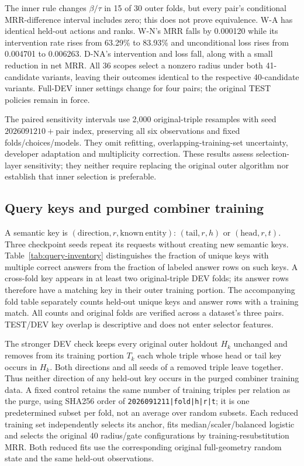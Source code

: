 \documentclass[11pt,a4paper]{article}
\begin{document}

The inner rule changes $\beta/\tau$ in 15 of 30 outer folds, but every pair's conditional MRR-difference interval includes zero; this does not prove equivalence. W-A has identical held-out actions and ranks. W-N's MRR falls by 0.000120 while its intervention rate rises from 63.29\% to 83.93\% and unconditional loss rises from 0.004701 to 0.006263. D-NA's intervention and loss fall, along with a small reduction in net MRR. All 36 scopes select a nonzero radius under both 41-candidate variants, leaving their outcomes identical to the respective 40-candidate variants. Full-DEV inner settings change for four pairs; the original TEST policies remain in force.

The paired sensitivity intervals use 2,000 original-triple resamples with seed $2026091210+$pair index, preserving all six observations and fixed folds/choices/models. They omit refitting, overlapping-training-set uncertainty, developer adaptation and multiplicity correction. These results assess selection-layer sensitivity; they neither require replacing the original outer algorithm nor establish that inner selection is preferable.


\FloatBarrier

\subsection{Query keys and purged combiner training}
\label{app:query-isolation}
A semantic key is $(\mathrm{direction},r,\mathrm{known\ entity})$: $(\mathrm{tail},r,h)$ or $(\mathrm{head},r,t)$. Three checkpoint seeds repeat its requests without creating new semantic keys. Table~\ref{tab:query-inventory} distinguishes the fraction of unique keys with multiple correct answers from the fraction of labeled answer rows on such keys. A cross-fold key appears in at least two original-triple DEV folds; its answer rows therefore have a matching key in their outer training portion. The accompanying fold table separately counts held-out unique keys and answer rows with a training match. All counts and original folds are verified across a dataset's three pairs. TEST/DEV key overlap is descriptive and does not enter selector features.


The stronger DEV check keeps every original outer holdout $H_k$ unchanged and removes from its training portion $T_k$ each whole triple whose head or tail key occurs in $H_k$. Both directions and all seeds of a removed triple leave together. Thus neither direction of any held-out key occurs in the purged combiner training data. A fixed control retains the same number of training triples per relation as the purge, using SHA256 order of \texttt{2026091211|fold|h|r|t}; it is one predetermined subset per fold, not an average over random subsets. Each reduced training set independently selects its anchor, fits median/scaler/balanced logistic and selects the original 40 radius/gate configurations by training-resubstitution MRR. Both reduced fits use the corresponding original full-geometry random state and the same held-out observations.
\end{document}
